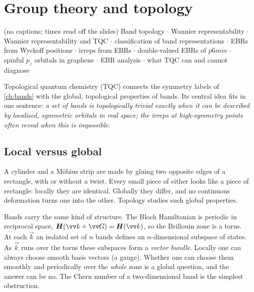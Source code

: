 \chapter{Group theory and topology}\label{ch:topology}

\begin{watch}{ (no captions; times read off the slides)}
Band topology  $\cdot$
Wannier representability  $\cdot$
Wannier representability and TQC  $\cdot$
classification of band representations  $\cdot$
EBRs from Wyckoff positions  $\cdot$
irreps from EBRs  $\cdot$
double-valued EBRs of $p6mm$  $\cdot$
spinful $p_z$ orbitals in graphene  $\cdot$
EBR analysis  $\cdot$
what TQC can and cannot diagnose 
\end{watch}

Topological quantum chemistry (TQC) connects the symmetry labels of \cref{ch:bands}
with the global, topological properties of bands. Its central idea fits in one
sentence: \emph{a set of bands is topologically trivial exactly when it can be
described by localised, symmetric orbitals in real space; the irreps at
high-symmetry points often reveal when this is impossible.}

\section{Local versus global}

A cylinder and a M\"obius strip are made by gluing two opposite edges of a rectangle,
with or without a twist. Every small piece of either looks like a piece of rectangle:
locally they are identical. Globally they differ, and no continuous deformation turns
one into the other. Topology studies such global properties.

Bands carry the same kind of structure. The Bloch Hamiltonian is periodic in
reciprocal space, $\mat{H}(\vec{k}+\vec{G})=\mat{H}(\vec{k})$, so the Brillouin zone is
a torus. At each $\vec{k}$ an isolated set of $n$ bands defines an $n$-dimensional
subspace of states. As $\vec{k}$ runs over the torus these subspaces form a
\emph{vector bundle}. Locally one can always choose smooth basis vectors (a gauge).
Whether one can choose them smoothly and periodically over the \emph{whole} zone is a
global question, and the answer can be no. The Chern number of a two-dimensional band
is the simplest obstruction.

